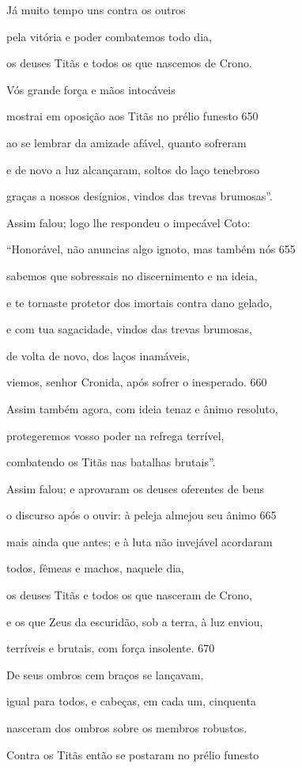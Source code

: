 Já muito tempo uns contra os outros

pela vitória e poder combatemos todo dia,

os deuses Titãs e todos os que nascemos de Crono.

Vós grande força e mãos intocáveis

mostrai em oposição aos Titãs no prélio funesto \num{650}

ao se lembrar da amizade afável, quanto sofreram

e de novo a luz alcançaram, soltos do laço tenebroso

graças a nossos desígnios, vindos das trevas brumosas''.

\quad{}Assim falou; logo lhe respondeu o impecável Coto:

``Honorável, não anuncias algo ignoto, mas também nós \num{655}

sabemos que sobressais no discernimento e na ideia,

e te tornaste protetor dos imortais contra dano gelado,

e com tua sagacidade, vindos das trevas brumosas,

de volta de novo, dos laços inamáveis,

viemos, senhor Cronida, após sofrer o inesperado. \num{660}

Assim também agora, com ideia tenaz e ânimo resoluto,

protegeremos vosso poder na refrega terrível,

combatendo os Titãs nas batalhas brutais''.

Assim falou; e aprovaram os deuses oferentes de bens

o discurso após o ouvir: à peleja almejou seu ânimo \num{665}

mais ainda que antes; e à luta não invejável acordaram

todos, fêmeas e machos, naquele dia,

os deuses Titãs e todos os que nasceram de Crono,

e os que Zeus da escuridão, sob a terra, à luz enviou,

terríveis e brutais, com força insolente. \num{670}

De seus ombros cem braços se lançavam,

igual para todos, e cabeças, em cada um, cinquenta

nasceram dos ombros sobre os membros robustos.

Contra os Titãs então se postaram no prélio funesto


